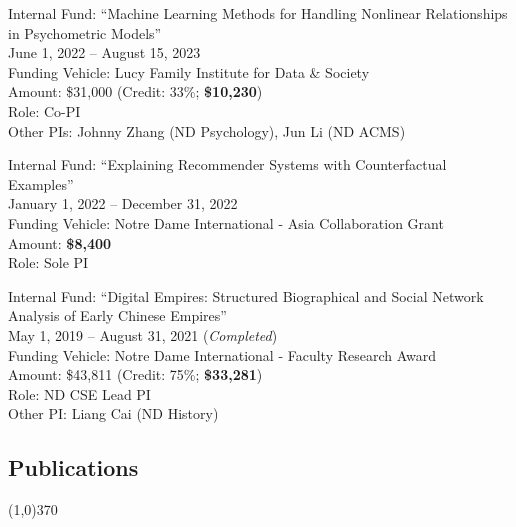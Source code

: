 \documentclass[10pt]{article}
\newenvironment{myindentpar}[1]%
{\begin{list}{}%
         {\setlength{\leftmargin}{#1}}%
         \item[]%
}
{\end{list}}
\newcounter{list}
\begin{document}
\begin{myindentpar}{0.75cm}
\hspace{-0.75cm}Internal Fund: ``Machine Learning Methods for Handling Nonlinear Relationships in Psychometric Models'' \\
June 1, 2022 -- August 15, 2023 \\
Funding Vehicle: Lucy Family Institute for Data \& Society \\
Amount: \$31,000 (Credit: 33\%; \textbf{\$10,230}) \\
Role: {Co-PI} \\
Other PIs: Johnny Zhang (ND Psychology), Jun Li (ND ACMS)

\hspace{-0.75cm}Internal Fund: ``Explaining Recommender Systems with Counterfactual Examples''\\
January 1, 2022 -- December 31, 2022 \\
Funding Vehicle: Notre Dame International - Asia Collaboration Grant \\
Amount: \textbf{\$8,400} \\
Role: {Sole PI}

\hspace{-0.75cm}Internal Fund: ``Digital Empires: Structured Biographical and Social Network Analysis of Early Chinese Empires'' \\
May 1, 2019 -- August 31, 2021 (\emph{Completed}) \\
Funding Vehicle: Notre Dame International - Faculty Research Award \\
Amount: \$43,811 (Credit: 75\%; \textbf{\$33,281}) \\
Role: {ND CSE Lead PI} \\
Other PI: Liang Cai (ND History)

\end{myindentpar}

\subsection{}
\subsection{\sc Publications}
\vspace{-0.4cm} \line(1,0){370} \vspace{-0.1cm}
\end{document}
